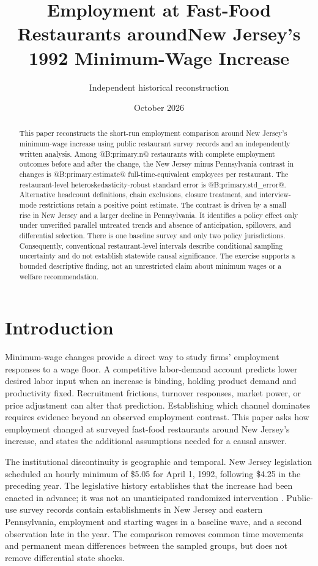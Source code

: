 \documentclass[11pt]{article}
\title{Employment at Fast-Food Restaurants around\newline New Jersey's 1992 Minimum-Wage Increase}
\author{Independent historical reconstruction}
\date{October 2026}
\begin{document}
\maketitle
\begin{abstract}
This paper reconstructs the short-run employment comparison around New Jersey's minimum-wage increase using public restaurant survey records and an independently written analysis. Among @B:primary.n@ restaurants with complete employment outcomes before and after the change, the New Jersey minus Pennsylvania contrast in changes is @B:primary.estimate@ full-time-equivalent employees per restaurant. The restaurant-level heteroskedasticity-robust standard error is @B:primary.std_error@. Alternative headcount definitions, chain exclusions, closure treatment, and interview-mode restrictions retain a positive point estimate. The contrast is driven by a small rise in New Jersey and a larger decline in Pennsylvania. It identifies a policy effect only under unverified parallel untreated trends and absence of anticipation, spillovers, and differential selection. There is one baseline survey and only two policy jurisdictions. Consequently, conventional restaurant-level intervals describe conditional sampling uncertainty and do not establish statewide causal significance. The exercise supports a bounded descriptive finding, not an unrestricted claim about minimum wages or a welfare recommendation. %
\end{abstract}

\section{Introduction}
Minimum-wage changes provide a direct way to study firms' employment responses to a wage floor. A competitive labor-demand account predicts lower desired labor input when an increase is binding, holding product demand and productivity fixed. Recruitment frictions, turnover responses, market power, or price adjustment can alter that prediction. Establishing which channel dominates requires evidence beyond an observed employment contrast. This paper asks how employment changed at surveyed fast-food restaurants around New Jersey's increase, and states the additional assumptions needed for a causal answer. %

The institutional discontinuity is geographic and temporal. New Jersey legislation scheduled an hourly minimum of \$5.05 for April 1, 1992, following \$4.25 in the preceding year. The legislative history establishes that the increase had been enacted in advance; it was not an unanticipated randomized intervention \citep{nj1990}. Public-use survey records contain establishments in New Jersey and eastern Pennsylvania, employment and starting wages in a baseline wave, and a second observation late in the year. The comparison removes common time movements and permanent mean differences between the sampled groups, but does not remove differential state shocks. %
\end{document}
